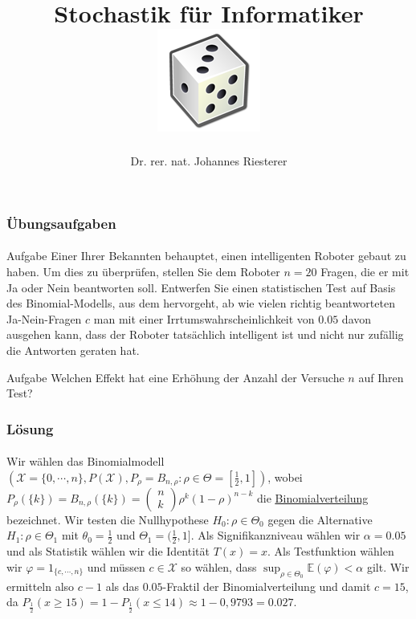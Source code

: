 \documentclass{beamer}
\begin{document}
\title[Stochastik] %
{Stochastik für Informatiker
\\
\includegraphics[scale=0.5]{img/craps}
}
\subtitle{}
\author[Dr. Johannes Riesterer] %
{Dr.  rer. nat. Johannes Riesterer}

\date[KPT 2004] %
{}

\subject{Stochastik}

\frame{\titlepage}

\begin{frame}
    \frametitle{Übungsaufgaben}
\framesubtitle{}
\begin{block}{Aufgabe}
Einer Ihrer Bekannten behauptet, einen intelligenten Roboter gebaut zu haben. Um dies zu überprüfen, stellen Sie dem Roboter $n=20$ Fragen, die er mit Ja oder Nein beantworten soll. Entwerfen Sie einen  statistischen Test auf Basis des Binomial-Modells,  aus dem hervorgeht, ab wie vielen richtig beantworteten Ja-Nein-Fragen $c$ man mit einer Irrtumswahrscheinlichkeit von $0.05$ davon ausgehen kann, dass der Roboter tatsächlich intelligent ist und nicht nur zufällig die Antworten geraten hat. 
\end{block}
\begin{block}{Aufgabe}
Welchen Effekt hat eine Erhöhung der Anzahl der Versuche $n$ auf Ihren Test?
\end{block}
 \end{frame}


\begin{frame}
    \frametitle{Lösung}
\framesubtitle{}
Wir wählen das Binomialmodell $(\mathcal{X}= \{ 0, \cdots, n\},  P(\mathcal{X}), P_\rho = B_{n, \rho} : \rho \in \Theta =  [\frac{1}{2}, 1] )$, wobei $P_\rho (\{k \})=  B_{n, \rho}(\{k\}) = \begin{pmatrix} n \\ k \end{pmatrix} \rho^k (1-\rho)^{n-k} $ die \href{https://de.wikipedia.org/wiki/Binomialverteilung}{\underline{Binomialverteilung}} bezeichnet. Wir testen die Nullhypothese $H_0: \rho \in \Theta_0$ gegen die Alternative $H_1: \rho \in \Theta_1$ mit $\theta_0 = \frac{1}{2}$ und $\Theta_1 = (\frac{1}{2}, 1]$. Als Signifikanzniveau wählen wir $\alpha = 0.05$ und als Statistik wählen wir die Identität $T(x) = x$. Als Testfunktion wählen wir $\varphi = 1_{ \{ c, \cdots, n \}}$ und müssen $c \in \mathcal{X}$ so wählen, dass $\sup_{\rho \in \Theta_0} \mathbb{E}(\varphi )  < \alpha$ gilt.  Wir ermitteln also $c-1$ als das $0.05$-Fraktil der Binomialverteilung und damit $c = 15$, da $P_{\frac{1}{2}} (x \geq15) = 1 -P_{\frac{1}{2}} (x \leq 14) \approx 1 - 0,9793 = 0.027$.

 \end{frame}
\end{document}
